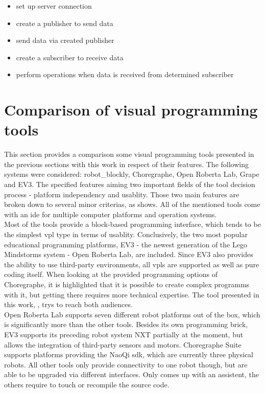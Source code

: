 \begin{itemize}
	\item set up server connection
	\item create a publisher to send data
	\item send data via created publisher
	\item create a subscriber to receive data
	\item perform operations when data is received from determined subscriber
\end{itemize}

\section{Comparison of visual programming tools}
This section provides a comparison some visual programming tools presented in the previous sections with this work in respect of their features. The following systems were considered: robot\_blockly\cite{erleROS}, Choregraphe\cite{Choregraphe5326209}, Open Roberta Lab\cite{Ketterl_Jost_Leimbach_Budde_2015}, Grape\cite{Grape} and EV3\cite{LegoEV3}. The specified features aiming two important fields of the tool decision process - platform independency and usablity. Those two main features are broken down to several minor criterias, as  shows. All of the mentioned tools come with an \gls{ide} for multiple computer platforms and operation systems. \\

Most of the tools provide a block-based programming interface, which tends to be the simplest \gls{vpl} type in terms of usablity. Conclusively, the two most popular educational programming platforms, EV3 - the newest generation of the Lego Mindstorms system - Open Roberta Lab, are included. Since EV3 also provides the ability to use third-party environments, all \glspl{vpl} are supported as well as pure coding itself. When looking at the provided programming options of Choregraphe, it is highlighted that it is possible to create complex programms with it, but getting there requires more technical expertise. The tool presented in this work, \toolname{}, trys to reach both audiences. \\

Open Roberta Lab supports seven different robot platforms out of the box, which is significantly more than the other tools. Besides its own programming brick, EV3 supports its
preceding robot system NXT partially at the moment, but allows the integration of third-party sensors and motors. Choregraphe Suite supports platforms providing the NaoQi \gls{sdk}, which are currently three physical robots. All other tools only provide connectivity to one robot though, but are able to be upgraded via different interfaces. Only \toolname{} comes up with an assistent, the others require to touch or recompile the source code. \\


